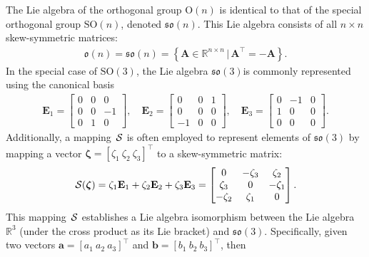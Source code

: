 \begin{example}\label{ex:orthogonal-group-special-orthogonal-group-lie-algebra}
    The Lie algebra of the orthogonal group $\text{O}(n)$  is identical to that of the special orthogonal group $\text{SO}(n)$, denoted $\mathfrak{so}(n)$. This Lie algebra consists of all $n\times n$ skew-symmetric matrices:
    \begin{align*}
        \mathfrak{o}(n)=\mathfrak{so}(n) = \left\{\mathbf{A}\in\mathbb{R}^{n\times n} \,|\, \mathbf{A}^\top = -\mathbf{A}\right\}.
    \end{align*}
    In the special case of $\text{SO}(3)$, the Lie algebra $\mathfrak{so}(3)$is commonly represented using the canonical basis
    \begin{align*}
        \mathbf{E}_1 = \begin{bmatrix} 0 & 0 & 0 \\ 0 & 0 & -1 \\ 0 & 1 & 0 \end{bmatrix}, \quad \mathbf{E}_2 = \begin{bmatrix} 0 & 0 & 1 \\ 0 & 0 & 0 \\ -1 & 0 & 0 \end{bmatrix}, \quad \mathbf{E}_3 = \begin{bmatrix} 0 & -1 & 0 \\ 1 & 0 & 0 \\ 0 & 0 & 0 \end{bmatrix}.
    \end{align*}
    Additionally, a mapping $\SL$ is often employed to represent elements of $\mathfrak{so}(3)$ by mapping a vector $\boldsymbol{\zeta} = [\zeta_1\ \zeta_2\ \zeta_3]^\top$ to a skew-symmetric matrix:
    \begin{align*}
        \SL[\boldsymbol{\zeta}] = \zeta_1 \mathbf{E}_1 + \zeta_2 \mathbf{E}_2 + \zeta_3 \mathbf{E}_3
        = \begin{bmatrix} 0 & -\zeta_3 & \zeta_2 \\ \zeta_3 & 0 & -\zeta_1 \\ -\zeta_2 & \zeta_1 & 0 \end{bmatrix}.
    \end{align*}
    This mapping $\SL$ establishes a Lie algebra isomorphism between the Lie algebra $\mathbb{R}^3$ (under the cross product as its Lie bracket) and $\mathfrak{so}(3)$. Specifically, given two vectors $\mathbf{a} = [a_1\ a_2\ a_3]^\top$ and $\mathbf{b} = [b_1\ b_2\ b_3]^\top$, then 
    \begin{align*}

\end{align*}
\end{example}
